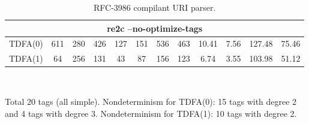 \documentclass{article}
\theoremstyle{definition}
\begin{document}
\begin{multicols}{2}
\begin{table}
\begin{center}
\begin{tabular}{|c|ccccccccccc|}
    \hline \hline
    \multicolumn{12}{|c|}{re2c --no-optimize-tags} \\
    \hline
    TDFA(0) & 611 & 280 & 426 & 127 & 151 & 536 & 463 & 10.41 & 7.56 & 127.48 & 75.46 \\
    TDFA(1) &  64 & 256 & 131 &  43 &  87 & 156 & 123 &  6.74 & 3.55 & 103.98 & 51.12 \\
    \hline
    \end{tabular}\\
    \caption{RFC-3986 compilant URI parser.}
    \smallskip
    \footnotesize{Total 20 tags (all simple).
    Nondeterminism for TDFA(0): 15 tags with degree 2 and 4 tags with degree 3.
    Nondeterminism for TDFA(1): 10 tags with degree 2.}
\end{center}
\end{table}




\end{multicols}
\end{document}

